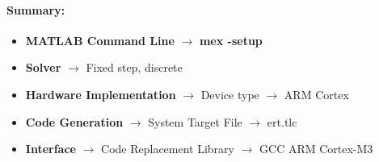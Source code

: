 \paragraph{Summary:}

\begin{itemize}

	\item \textbf{MATLAB Command Line} $\rightarrow$ \textbf{mex -setup}
    \item \textbf{Solver} $\rightarrow$ Fixed step, discrete
    \item \textbf{Hardware Implementation} $\rightarrow$ Device type $\rightarrow$ ARM Cortex
    \item \textbf{Code Generation} $\rightarrow$ System Target File $\rightarrow$ ert.tlc
    \item \textbf{Interface} $\rightarrow$ Code Replacement Library $\rightarrow$ GCC ARM Cortex-M3

\end{itemize}
